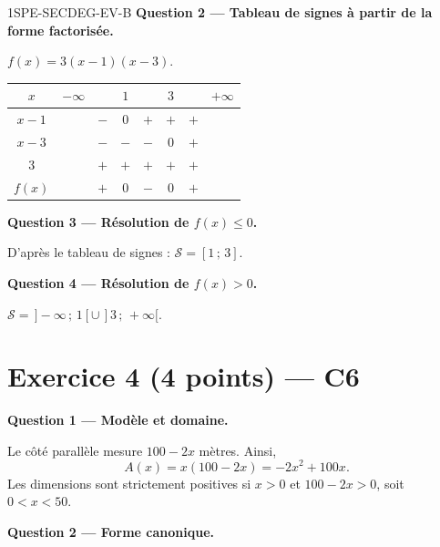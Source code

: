 \begin{corrige}{1SPE-SECDEG-EV-B}
\medskip
\textbf{Question 2 — Tableau de signes à partir de la forme factorisée.}


$f(x) = 3(x-1)(x-3)$.

\begin{center}
\begin{tabular}{|c|ccccccc|}
\hline
$x$ & $-\infty$ & & $1$ & & $3$ & & $+\infty$ \\
\hline
$x - 1$ & & $-$ & $0$ & $+$ & $+$ & $+$ & \\
$x - 3$ & & $-$ & $-$ & $-$ & $0$ & $+$ & \\
$3$ & & $+$ & $+$ & $+$ & $+$ & $+$ & \\
\hline
$f(x)$ & & $+$ & $0$ & $-$ & $0$ & $+$ & \\
\hline
\end{tabular}
\end{center}

\medskip
\textbf{Question 3 — Résolution de $f(x) \leq 0$.}

D'après le tableau de signes : $\boxed{\mathcal{S} = [1\,;\,3]}$.

\medskip
\textbf{Question 4 — Résolution de $f(x) > 0$.}

$\boxed{\mathcal{S} = \,]-\infty\,;\,1[ \cup \,]3\,;\,+\infty[}$.

\section*{Exercice 4 \hfill (4 points) — C6}


\bigskip
\textbf{Question 1 — Modèle et domaine.}


Le côté parallèle mesure $100-2x$ mètres. Ainsi,
\[A(x)=x(100-2x)=-2x^2+100x.\]
Les dimensions sont strictement positives si $x>0$ et $100-2x>0$,
soit $0<x<50$.

\medskip
\textbf{Question 2 — Forme canonique.}



\end{corrige}
